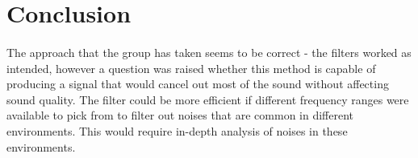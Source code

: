 \section{Conclusion}
\paragraph{} The approach that the group has taken seems to be correct - the filters worked as intended, however a question was raised whether this method is capable of producing a signal that would cancel out most of the sound without affecting sound quality. The filter could be more efficient if different frequency ranges were available to pick from to filter out noises that are common in different environments. This would require in-depth analysis of noises in these environments.  


  